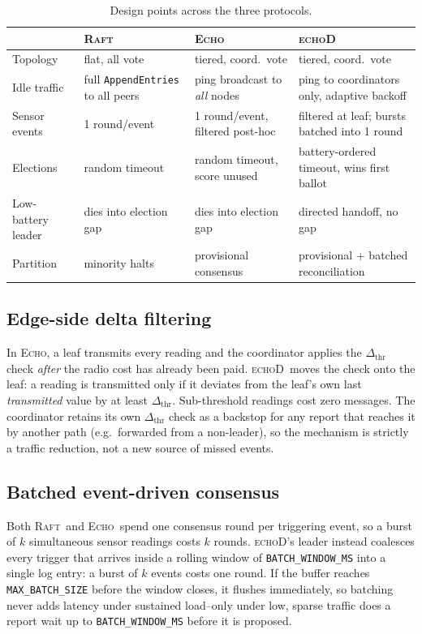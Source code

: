 \documentclass[conference]{IEEEtran}
\newcommand{\echoproto}{\textsc{Echo}\xspace}
\newcommand{\raftproto}{\textsc{Raft}\xspace}
\newcommand{\echodproto}{\textsc{echoD}\xspace}
\begin{document}
\begin{table}[t]
\centering
\caption{Design points across the three protocols.}
\label{tab:echod-compare}
\setlength{\tabcolsep}{2.5pt}
\footnotesize
\begin{tabular}{@{}p{13mm}p{24mm}p{24mm}p{25mm}@{}}
\toprule
 & \raftproto & \echoproto & \echodproto \\
\midrule
Topology & flat, all vote & tiered, coord.\ vote & tiered, coord.\ vote \\
Idle traffic & full \texttt{AppendEntries} to all peers & ping broadcast to \emph{all} nodes & ping to coordinators only, adaptive backoff \\
Sensor events & 1 round/event & 1 round/event, filtered post-hoc & filtered at leaf; bursts batched into 1 round \\
Elections & random timeout & random timeout, score unused & battery-ordered timeout, wins first ballot \\
Low-battery leader & dies into election gap & dies into election gap & directed handoff, no gap \\
Partition & minority halts & provisional consensus & provisional + batched reconciliation \\
\bottomrule
\end{tabular}
\end{table}

\subsection{Edge-side delta filtering}
In \echoproto, a leaf transmits every reading and the coordinator applies
the $\Delta_{\text{thr}}$ check \emph{after} the radio cost has already
been paid. \echodproto\ moves the check onto the leaf: a reading is
transmitted only if it deviates from the leaf's own last
\emph{transmitted} value by at least $\Delta_{\text{thr}}$. Sub-threshold
readings cost zero messages. The coordinator retains its own
$\Delta_{\text{thr}}$ check as a backstop for any report that reaches it
by another path (e.g.\ forwarded from a non-leader), so the mechanism is
strictly a traffic reduction, not a new source of missed events.

\subsection{Batched event-driven consensus}
Both \raftproto\ and \echoproto\ spend one consensus round per triggering
event, so a burst of $k$ simultaneous sensor readings costs $k$ rounds.
\echodproto's leader instead coalesces every trigger that arrives inside
a rolling window of \texttt{BATCH\_WINDOW\_MS} into a single log entry:
a burst of $k$ events costs one round. If the buffer reaches
\texttt{MAX\_BATCH\_SIZE} before the window closes, it flushes
immediately, so batching never adds latency under sustained load--only
under low, sparse traffic does a report wait up to
\texttt{BATCH\_WINDOW\_MS} before it is proposed.
\end{document}
